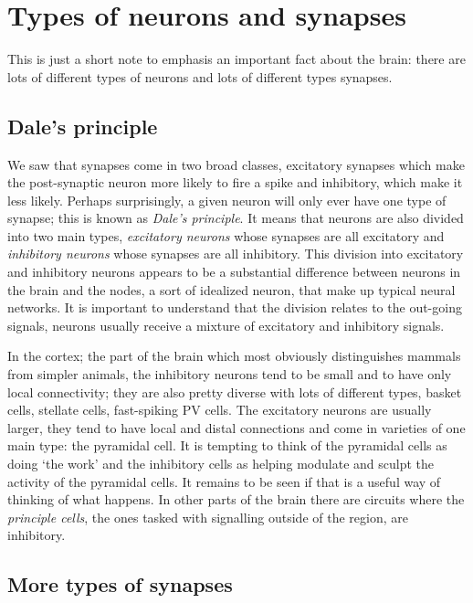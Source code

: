 \documentclass[12pt]{article}
\begin{document}
\section*{Types of neurons and synapses}

This is just a short note to emphasis an important fact about the
brain: there are lots of different types of neurons and lots of
different types synapses.

\subsection*{Dale's principle}

We saw that synapses come in two broad classes, excitatory synapses
which make the post-synaptic neuron more likely to fire a spike and
inhibitory, which make it less likely. Perhaps surprisingly, a given
neuron will only ever have one type of synapse; this is known as
\textsl{Dale's principle}. It means that neurons are also divided into
two main types, \textsl{excitatory neurons} whose synapses are all
excitatory and \textsl{inhibitory neurons} whose synapses are all
inhibitory. This division into excitatory and inhibitory neurons
appears to be a substantial difference between neurons in the brain
and the nodes, a sort of idealized neuron, that make up typical neural
networks. It is important to understand that the division relates to
the out-going signals, neurons usually receive a mixture of excitatory
and inhibitory signals.

In the cortex; the part of the brain which most obviously
distinguishes mammals from simpler animals, the inhibitory neurons
tend to be small and to have only local connectivity; they are also
pretty diverse with lots of different types, basket cells, stellate
cells, fast-spiking PV cells. The excitatory neurons are usually
larger, they tend to have local and distal connections and come in
varieties of one main type: the pyramidal cell. It is tempting to
think of the pyramidal cells as doing `the work' and the inhibitory
cells as helping modulate and sculpt the activity of the pyramidal
cells. It remains to be seen if that is a useful way of thinking of
what happens. In other parts of the brain there are circuits where the
\textsl{principle cells}, the ones tasked with signalling outside of
the region, are inhibitory.


\subsection*{More types of synapses}
\end{document}
